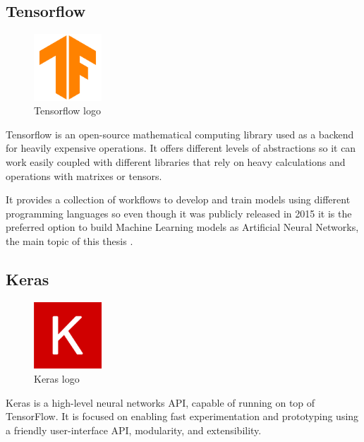 \newpage
\subsection{Tensorflow}

\begin{figure}[th]
    \centering
    \begin{center}
        \includegraphics[height=25mm]{Figures/tensorflow}
    \end{center}
    \decoRule
    \caption{Tensorflow logo}
    \label{fig:tensorflow logo}
\end{figure}

Tensorflow is an open-source mathematical computing library used as a backend for heavily expensive operations.
It offers different levels of abstractions so it can work easily coupled with different libraries that rely on heavy calculations and operations with matrixes or tensors.

It provides a collection of workflows to develop and train models using different programming languages so even though it was publicly released in 2015 it is the preferred option to build Machine Learning models as Artificial Neural Networks, the main topic of this thesis \cite{tensorflow}.

\subsection{Keras}

\begin{figure}[th]
    \centering
    \begin{center}
        \includegraphics[height=25mm]{Figures/keras}
    \end{center}
    \decoRule
    \caption{Keras logo}
    \label{fig:keras logo}
\end{figure}

Keras is a high-level neural networks API, capable of running on top of TensorFlow. 
It is focused on enabling fast experimentation and prototyping using a friendly user-interface API, modularity, and extensibility. 


